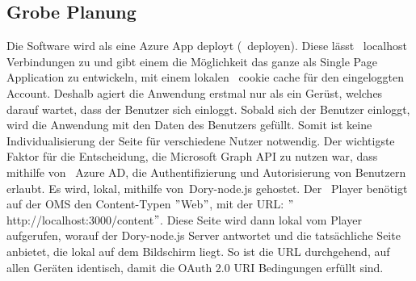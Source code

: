 \subsection{Grobe Planung}\label{subsec:grobe-planung}
Die Software wird als eine Azure App deployt (~\gls{deployen}).
Diese lässt ~\gls{localhost} Verbindungen zu und gibt einem die Möglichkeit das ganze als Single Page Application zu entwickeln, mit einem lokalen ~\gls{cookie cache} für den eingeloggten Account.
Deshalb agiert die Anwendung erstmal nur als ein Gerüst, welches darauf wartet, dass der Benutzer sich einloggt.
Sobald sich der Benutzer einloggt, wird die Anwendung mit den Daten des Benutzers gefüllt.
Somit ist keine Individualisierung der Seite für verschiedene Nutzer notwendig.
\newline
{}
Der wichtigste Faktor für die Entscheidung, die Microsoft Graph API zu nutzen war, dass mithilfe von ~\gls{Azure AD}, die Authentifizierung und Autorisierung von Benutzern erlaubt.
Es wird, lokal, mithilfe von~\gls{Dory-node.js} gehostet.
\newline
Der ~\gls{Player} benötigt auf der OMS den Content-Typen \("\)Web\("\),
\newline
mit der URL: \("\)http://localhost:3000/content\("\).
Diese Seite wird dann lokal vom Player aufgerufen, worauf der Dory-node.js Server antwortet und die tatsächliche Seite anbietet, die lokal auf dem Bildschirm liegt.
So ist die URL durchgehend, auf allen Geräten identisch, damit die OAuth 2.0 URI Bedingungen erfüllt sind.
\newline
\newline
\newline
\pagebreak


